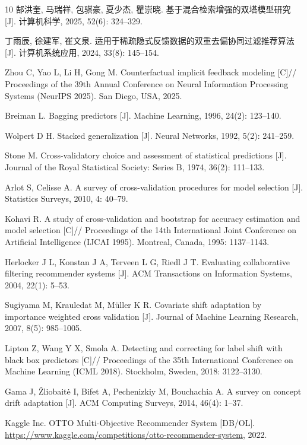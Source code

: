 \documentclass[a4paper, AutoFakeBold, UTF8]{ctexrep}
\theoremstyle{plain}
\numberwithin{equation}{chapter}
\begin{document}
\begin{thebibliography}{10}
郜洪奎, 马瑞祥, 包骐豪, 夏少杰, 瞿崇晓. 基于混合检索增强的双塔模型研究 [J]. 计算机科学, 2025, 52(6): 324--329.

丁雨辰, 徐建军, 崔文泉. 适用于稀疏隐式反馈数据的双重去偏协同过滤推荐算法 [J]. 计算机系统应用, 2024, 33(8): 145--154.

Zhou C, Yao L, Li H, Gong M. Counterfactual implicit feedback modeling [C]// Proceedings of the 39th Annual Conference on Neural Information Processing Systems (NeurIPS 2025). San Diego, USA, 2025.

Breiman L. Bagging predictors [J]. Machine Learning, 1996, 24(2): 123--140.

Wolpert D H. Stacked generalization [J]. Neural Networks, 1992, 5(2): 241--259.

Stone M. Cross-validatory choice and assessment of statistical predictions [J]. Journal of the Royal Statistical Society: Series B, 1974, 36(2): 111--133.

Arlot S, Celisse A. A survey of cross-validation procedures for model selection [J]. Statistics Surveys, 2010, 4: 40--79.

Kohavi R. A study of cross-validation and bootstrap for accuracy estimation and model selection [C]// Proceedings of the 14th International Joint Conference on Artificial Intelligence (IJCAI 1995). Montreal, Canada, 1995: 1137--1143.

Herlocker J L, Konstan J A, Terveen L G, Riedl J T. Evaluating collaborative filtering recommender systems [J]. ACM Transactions on Information Systems, 2004, 22(1): 5--53.

Sugiyama M, Krauledat M, Müller K R. Covariate shift adaptation by importance weighted cross validation [J]. Journal of Machine Learning Research, 2007, 8(5): 985--1005.

Lipton Z, Wang Y X, Smola A. Detecting and correcting for label shift with black box predictors [C]// Proceedings of the 35th International Conference on Machine Learning (ICML 2018). Stockholm, Sweden, 2018: 3122--3130.

Gama J, Žliobaitė I, Bifet A, Pechenizkiy M, Bouchachia A. A survey on concept drift adaptation [J]. ACM Computing Surveys, 2014, 46(4): 1--37.

Kaggle Inc. OTTO Multi-Objective Recommender System [DB/OL]. \url{https://www.kaggle.com/competitions/otto-recommender-system}, 2022.


\end{thebibliography}
\end{document}
